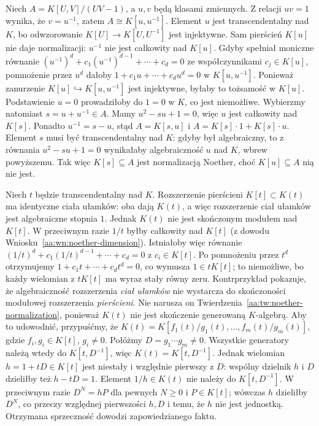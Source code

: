 \begin{przyklad}
Niech $A=K[U,V]/(UV-1)$, a $u,v$ będą klasami zmiennych.
Z relacji $uv=1$ wynika, że $v=u^{-1}$, zatem
$A\cong K[u,u^{-1}]$. Element $u$ jest transcendentalny
nad $K$, bo odwzorowanie $K[U]\to K[U,U^{-1}]$
jest injektywne.
Sam pierścień $K[u]$ nie daje normalizacji: $u^{-1}$
nie jest całkowity nad $K[u]$. Gdyby spełniał moniczne
równanie $(u^{-1})^d+c_1(u^{-1})^{d-1}+\cdots+c_d=0$
ze współczynnikami $c_j\in K[u]$, pomnożenie przez $u^d$
dałoby $1+c_1u+\cdots+c_du^d=0$ w $K[u,u^{-1}]$.
Ponieważ zanurzenie $K[u]\hookrightarrow K[u,u^{-1}]$
jest injektywne, byłaby to tożsamość w $K[u]$.
Podstawienie $u=0$ prowadziłoby do $1=0$ w $K$,
co jest niemożliwe.
Wybierzmy natomiast $s=u+u^{-1}\in A$.
Mamy $u^2-su+1=0$, więc $u$ jest całkowity nad $K[s]$.
Ponadto $u^{-1}=s-u$, stąd $A=K[s,u]$ i
$A=K[s]\cdot1+K[s]\cdot u$.
Element $s$ musi być transcendentalny nad $K$:
gdyby był algebraiczny, to z równania $u^2-su+1=0$
wynikałaby algebraiczność $u$ nad $K$, wbrew powyższemu.
Tak więc $K[s]\subseteq A$ jest normalizacją Noether,
choć $K[u]\subseteq A$ nią nie jest.
\end{przyklad}

\begin{przyklad}
\label{aa:prz:noether-nonfinite}
Niech $t$ będzie transcendentalny nad $K$.
Rozszerzenie pierścieni $K[t]\subset K(t)$ ma identyczne
ciała ułamków: oba dają $K(t)$, a więc rozszerzenie
ciał ułamków jest algebraiczne stopnia $1$.
Jednak $K(t)$ nie jest skończonym modułem nad $K[t]$.
W przeciwnym razie $1/t$ byłby całkowity nad $K[t]$
(z dowodu Wniosku~\ref{aa:wn:noether-dimension}).
Istniałoby więc równanie
$(1/t)^d+c_1(1/t)^{d-1}+\cdots+c_d=0$ z $c_i\in K[t]$.
Po pomnożeniu przez $t^d$ otrzymujemy
$1+c_1t+\cdots+c_dt^d=0$, co wymusza $1\in tK[t]$;
to niemożliwe, bo każdy wielomian z $tK[t]$ ma wyraz
stały równy zeru.
Kontrprzykład pokazuje, że algebraiczność rozszerzenia
\emph{ciał ułamków} nie wystarcza do skończoności
modułowej rozszerzenia \emph{pierścieni}.
Nie narusza on Twierdzenia~\ref{aa:tw:noether-normalization},
ponieważ $K(t)$ nie jest skończenie generowaną $K$-algebrą.
Aby to udowodnić, przypuśćmy, że
$K(t)=K[f_1(t)/g_1(t),\ldots,f_m(t)/g_m(t)]$,
gdzie $f_i,g_i\in K[t]$, $g_i\ne0$.
Połóżmy $D=g_1\cdots g_m\ne0$.
Wszystkie generatory należą wtedy do $K[t,D^{-1}]$,
więc $K(t)=K[t,D^{-1}]$. Jednak wielomian
$h=1+tD\in K[t]$ jest niestały i względnie pierwszy
z $D$: wspólny dzielnik $h$ i $D$ dzieliłby też
$h-tD=1$. Element $1/h\in K(t)$ nie należy do
$K[t,D^{-1}]$. W przeciwnym razie
$D^N=hP$ dla pewnych $N\ge0$ i $P\in K[t]$;
wówczas $h$ dzieliłby $D^N$, co przeczy względnej
pierwszości $h,D$ i temu, że $h$ nie jest jednostką.
Otrzymana sprzeczność dowodzi zapowiedzianego faktu.
\end{przyklad}



